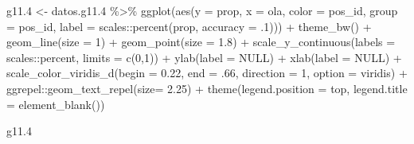 \documentclass[
  12pt,
]{book}
\newenvironment{Shaded}{\begin{snugshade}}{\end{snugshade}}
\newcommand{\AttributeTok}[1]{\textcolor[rgb]{0.77,0.63,0.00}{#1}}
\newcommand{\ConstantTok}[1]{\textcolor[rgb]{0.00,0.00,0.00}{#1}}
\newcommand{\DecValTok}[1]{\textcolor[rgb]{0.00,0.00,0.81}{#1}}
\newcommand{\FloatTok}[1]{\textcolor[rgb]{0.00,0.00,0.81}{#1}}
\newcommand{\FunctionTok}[1]{\textcolor[rgb]{0.00,0.00,0.00}{#1}}
\newcommand{\NormalTok}[1]{#1}
\newcommand{\OtherTok}[1]{\textcolor[rgb]{0.56,0.35,0.01}{#1}}
\newcommand{\SpecialCharTok}[1]{\textcolor[rgb]{0.00,0.00,0.00}{#1}}
\newcommand{\StringTok}[1]{\textcolor[rgb]{0.31,0.60,0.02}{#1}}
\begin{document}
\begin{Shaded}
\begin{Highlighting}[]
\NormalTok{g11}\FloatTok{.4} \OtherTok{\textless{}{-}}\NormalTok{ datos.g11}\FloatTok{.4} \SpecialCharTok{\%\textgreater{}\%} 
  \FunctionTok{ggplot}\NormalTok{(}\FunctionTok{aes}\NormalTok{(}\AttributeTok{y =}\NormalTok{ prop, }\AttributeTok{x =}\NormalTok{ ola, }\AttributeTok{color =}\NormalTok{ pos\_id, }\AttributeTok{group =}\NormalTok{ pos\_id,}
              \AttributeTok{label =}\NormalTok{ scales}\SpecialCharTok{::}\FunctionTok{percent}\NormalTok{(prop, }\AttributeTok{accuracy =}\NormalTok{ .}\DecValTok{1}\NormalTok{))) }\SpecialCharTok{+}
  \FunctionTok{theme\_bw}\NormalTok{() }\SpecialCharTok{+}   
  \FunctionTok{geom\_line}\NormalTok{(}\AttributeTok{size =} \DecValTok{1}\NormalTok{) }\SpecialCharTok{+}
  \FunctionTok{geom\_point}\NormalTok{(}\AttributeTok{size =} \FloatTok{1.8}\NormalTok{) }\SpecialCharTok{+}
  \FunctionTok{scale\_y\_continuous}\NormalTok{(}\AttributeTok{labels =}\NormalTok{ scales}\SpecialCharTok{::}\NormalTok{percent,}
                     \AttributeTok{limits =} \FunctionTok{c}\NormalTok{(}\DecValTok{0}\NormalTok{,}\DecValTok{1}\NormalTok{)) }\SpecialCharTok{+}
  \FunctionTok{ylab}\NormalTok{(}\AttributeTok{label =} \ConstantTok{NULL}\NormalTok{) }\SpecialCharTok{+}
  \FunctionTok{xlab}\NormalTok{(}\AttributeTok{label =} \ConstantTok{NULL}\NormalTok{) }\SpecialCharTok{+}
  \FunctionTok{scale\_color\_viridis\_d}\NormalTok{(}\AttributeTok{begin =} \FloatTok{0.22}\NormalTok{, }\AttributeTok{end =}\NormalTok{ .}\DecValTok{66}\NormalTok{, }\AttributeTok{direction =} \DecValTok{1}\NormalTok{, }\AttributeTok{option =} \StringTok{\textquotesingle{}viridis\textquotesingle{}}\NormalTok{) }\SpecialCharTok{+}
\NormalTok{  ggrepel}\SpecialCharTok{::}\FunctionTok{geom\_text\_repel}\NormalTok{(}\AttributeTok{size=} \FloatTok{2.25}\NormalTok{) }\SpecialCharTok{+} 
  \FunctionTok{theme}\NormalTok{(}\AttributeTok{legend.position =} \StringTok{\textquotesingle{}top\textquotesingle{}}\NormalTok{,}
        \AttributeTok{legend.title =} \FunctionTok{element\_blank}\NormalTok{())}

\NormalTok{g11}\FloatTok{.4}
\end{Highlighting}
\end{Shaded}
\end{document}
